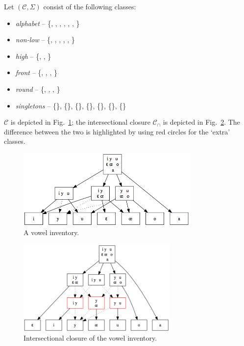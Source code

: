 \documentclass[11pt, oneside]{article}   	%
\begin{document}
\vspace{\baselineskip} \noindent Let $(\mathcal C, \Sigma)$ consist of the following classes: \begin{itemize}
  \item \textit{alphabet} -- \{, , , , \textipa{\oe}, , \} 
  \item \textit{non-low} -- \{, , , , \textipa{\oe}, \} 
  \item \textit{high} -- \{, , \}
  \item \textit{front} -- \{, , , \textipa{\oe}\}
  \item \textit{round} -- \{, , \textipa{\oe}, \}
  \item \textit{singletons} -- \{\}, \{\}, \{\}, \{\}, \{\textipa{\oe}\}, \{\}, \{\}
  \end{itemize}

\vspace{\baselineskip} \noindent $\mathcal C$ is depicted in Fig.~\ref{fig:vowel_inventory}; the intersectional closure $\mathcal C_\cap$ is depicted in Fig.~\ref{fig:vowel_inventory_closure}. The difference between the two is highlighted by using red circles for the `extra' classes.

\begin{figure}[h]
  \centering
  \includegraphics[width=0.8\textwidth]{vowel_inventory_base.png}
  \caption{A vowel inventory.}
  \label{fig:vowel_inventory}
\end{figure}

\begin{figure}[h]
  \centering
  \includegraphics[width=0.7\textwidth]{vowel_inventory_closure.png}
  \caption{Intersectional closure of the vowel inventory.}
  \label{fig:vowel_inventory_closure}
\end{figure}
\end{document}
